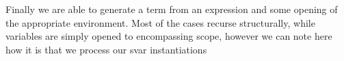 Finally we are able to generate a term from an expression and some opening
of the appropriate environment. Most of the cases recurse structurally, while
variables are simply opened to encompassing scope, however we can note here
how it is that we process our svar instantiations

\begin{code}%
\>[0]%
\>[8]\AgdaSymbol{:}\AgdaSpace{}%
\AgdaSymbol{(}\AgdaSpace{}%
\AgdaSpace{}%
\AgdaSymbol{)}\AgdaSpace{}%
\AgdaSpace{}%
\AgdaSpace{}%
\AgdaSpace{}%
\AgdaSpace{}%
\AgdaSpace{}%
\AgdaSpace{}%
\AgdaSpace{}%
\AgdaSpace{}%
\AgdaSpace{}%
\AgdaSymbol{(}\AgdaSpace{}%
\AgdaOperator{\AgdaPrimitive{+}}\AgdaSpace{}%
\AgdaSymbol{)}\<%
\\
\>[0]\<%
\\
\>[0]\AgdaSpace{}%
\AgdaSymbol{\{}\AgdaSpace{}%
\AgdaSymbol{=}\AgdaSpace{}%
\AgdaSymbol{\}}\AgdaSpace{}%
\AgdaSymbol{\{}\AgdaSpace{}%
\AgdaSymbol{=}\AgdaSpace{}%
\AgdaSymbol{\}}\AgdaSpace{}%
\AgdaSymbol{\{}\AgdaSpace{}%
\AgdaSymbol{=}\AgdaSpace{}%
\AgdaSymbol{\}}\AgdaSpace{}%
\AgdaSpace{}%
\AgdaSymbol{(}\AgdaSpace{}%
\AgdaOperator{\AgdaInductiveConstructor{/}}\AgdaSpace{}%
\AgdaSymbol{)}\<%
\\
\>[0][@{}l@{\AgdaIndent{0}}]%
\>[2]\AgdaSymbol{=}%
\>[561I]\AgdaSpace{}%
%
\>[15]\AgdaSymbol{=}\AgdaSpace{}%
\AgdaSpace{}%
\AgdaSpace{}%
%
\>[36]\<%
\\
\>[.][@{}l@{}]\<[561I]%
\>[4]\AgdaSpace{}%
%
\>[15]\AgdaSymbol{=}\AgdaSpace{}%
\AgdaSpace{}%
\AgdaSpace{}%
\AgdaSymbol{(}\AgdaSpace{}%
\AgdaSpace{}%
\AgdaSymbol{)}%
\>[36]\<%
\\
\>[4][@{}l@{\AgdaIndent{0}}]%
\>[6]\AgdaSymbol{(}\AgdaSpace{}%
\AgdaSpace{}%
\AgdaSymbol{)}\AgdaSpace{}%
\AgdaSpace{}%
\AgdaSymbol{((}\AgdaSpace{}%
\AgdaOperator{\AgdaFunction{++}}\AgdaSpace{}%
\AgdaSymbol{))}\<%
\\
\>[0]\<%
\end{code}

